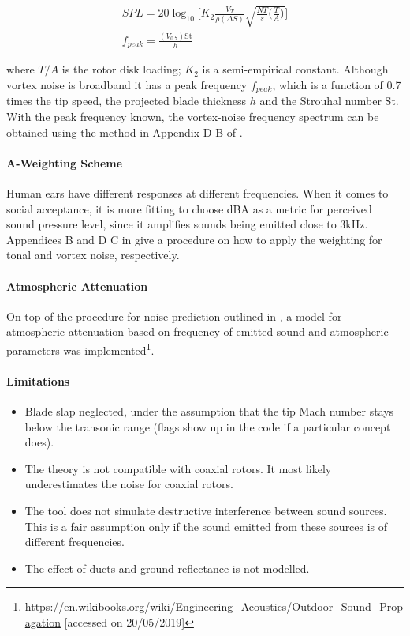 \begin{align}
    SPL = 20 \log_10 \bigg[ K_2 \frac{V_T}{\rho (\Delta S)} \sqrt{\frac{NT}{s} \Big(\frac{T}{A} \Big)} \bigg] \\
    f_{peak} = \frac{(V_{0.7})\text{St}}{h}
\end{align}

where $T/A$ is the rotor disk loading; $K_2$ is a semi-empirical constant. Although vortex noise is broadband it has a peak frequency $f_{peak}$, which is a function of 0.7 times the tip speed, the projected blade thickness $h$ and the Strouhal number St. With the peak frequency known, the vortex-noise frequency spectrum can be obtained using the method in Appendix D B of \cite{Brown2018}.


\paragraph{A-Weighting Scheme}

Human ears have different responses at different frequencies. When it comes to social acceptance, it is more fitting to choose dBA as a metric for perceived sound pressure level, since it amplifies sounds being emitted close to 3kHz. Appendices B and D C in \cite{Brown2018} give a procedure on how to apply the weighting for tonal and vortex noise, respectively.

\paragraph{Atmospheric Attenuation}

On top of the procedure for noise prediction outlined in \cite{Brown2018}, a model for atmospheric attenuation based on frequency of emitted sound and atmospheric parameters was implemented\footnote{\url{ https://en.wikibooks.org/wiki/Engineering_Acoustics/Outdoor_Sound_Propagation} [accessed on 20/05/2019]}.



\paragraph{Limitations}

\begin{itemize}
    \item Blade slap neglected, under the assumption that the tip Mach number stays below the transonic range (flags show up in the code if a particular concept does).
    \item The theory is not compatible with coaxial rotors. It most likely underestimates the noise for coaxial rotors. 
    \item The tool does not simulate destructive interference between sound sources. This is a fair assumption only if the sound emitted from these sources is of different frequencies.
    \item The effect of ducts and ground reflectance is not modelled.
\end{itemize}
 

